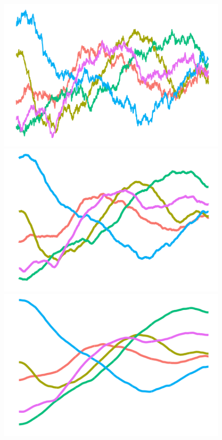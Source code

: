 \begin{figure}[hbt]
  \centering
  \includegraphics[scale=0.22]{figure/kernel_path_fbm_01_th}
  \includegraphics[scale=0.43]{figure/kernel_path_fbm_03_th}
  \includegraphics[scale=0.43]{figure/kernel_path_fbm_05_th}

\end{figure}
